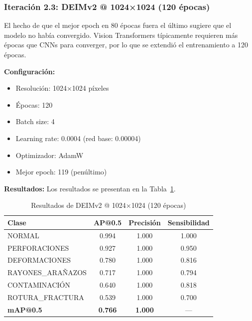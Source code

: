 \subsubsection{Iteración 2.3: DEIMv2 @ 1024×1024 (120 épocas)}

El hecho de que el mejor epoch en 80 épocas fuera el último sugiere que el modelo no había convergido. Vision Transformers típicamente requieren más épocas que CNNs para converger, por lo que se extendió el entrenamiento a 120 épocas.

\textbf{Configuración:}
\begin{itemize}
    \item Resolución: 1024×1024 píxeles
    \item Épocas: 120
    \item Batch size: 4
    \item Learning rate: 0.0004 (red base: 0.00004)
    \item Optimizador: AdamW
    \item Mejor epoch: 119 (penúltimo)
\end{itemize}

\textbf{Resultados:} Los resultados se presentan en la Tabla~\ref{tab:deimv2_1024_120ep}.

\begin{table}[htbp]
\centering
\begin{tabular}{lccc}
\toprule
\textbf{Clase} & \textbf{AP@0.5} & \textbf{Precisión} & \textbf{Sensibilidad} \\
\midrule
NORMAL & 0.994 & 1.000 & 1.000 \\
PERFORACIONES & 0.927 & 1.000 & 0.950 \\
DEFORMACIONES & 0.780 & 1.000 & 0.816 \\
\mbox{RAYONES\_ARAÑAZOS} & 0.717 & 1.000 & 0.794 \\
CONTAMINACIÓN & 0.640 & 1.000 & 0.818 \\
\mbox{ROTURA\_FRACTURA} & 0.539 & 1.000 & 0.700 \\
\midrule
\textbf{mAP@0.5} & \textbf{0.766} & \textbf{1.000} & --- \\
\bottomrule
\end{tabular}
\caption{Resultados de DEIMv2 @ 1024×1024 (120 épocas)}
\label{tab:deimv2_1024_120ep}
\end{table}

